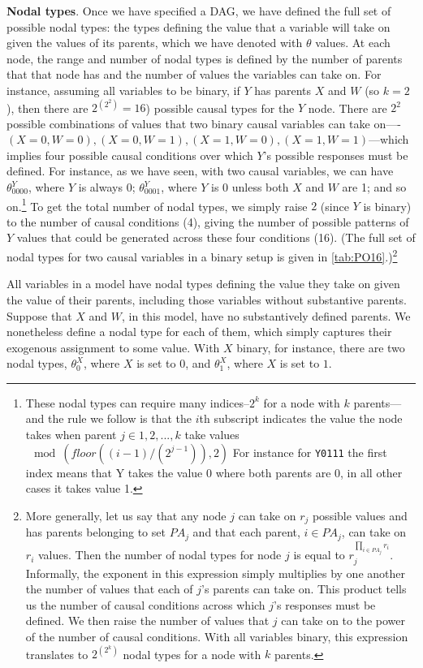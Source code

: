 \documentclass[12pt,]{book}
\let\rmarkdownfootnote\footnote%
\def\footnote{\protect\rmarkdownfootnote}
\begin{document}
\textbf{Nodal types}. Once we have specified a DAG, we have defined the full set of possible nodal types: the types defining the value that a variable will take on given the values of its parents, which we have denoted with \(\theta\) values. At each node, the range and number of nodal types is defined by the number of parents that that node has and the number of values the variables can take on. For instance, assuming all variables to be binary, if \(Y\) has parents \(X\) and \(W\) (so \(k=2\)), then there are \(2^{\left(2^2\right)}=16\)) possible causal types for the \(Y\) node. There are \(2^2\) possible combinations of values that two binary causal variables can take on----\((X=0,W=0), (X=0,W=1), (X=1,W=0), (X=1,W=1)\)---which implies four possible causal conditions over which \(Y\)'s possible responses must be defined. For instance, as we have seen, with two causal variables, we can have \(\theta^Y_{0000}\), where \(Y\) is always 0; \(\theta^Y_{0001}\), where \(Y\) is 0 unless both \(X\) and \(W\) are 1; and so on.\footnote{These nodal types can require many indices--\(2^k\) for a node with \(k\) parents---and the rule we follow is that the \(i\)th subscript indicates the value the node takes when parent \(j \in {1, 2, ..., k}\) take values \(\mod(floor((i-1)/(2^{j-1})), 2)\) For instance for \texttt{Y0111} the first index means that Y takes the value 0 where both parents are 0, in all other cases it takes value 1.} To get the total number of nodal types, we simply raise \(2\) (since \(Y\) is binary) to the number of causal conditions (4), giving the number of possible patterns of \(Y\) values that could be generated across these four conditions (16). (The full set of nodal types for two causal variables in a binary setup is given in \ref{tab:PO16}.)\footnote{More generally, let us say that any node \(j\) can take on \(r_j\) possible values and has parents belonging to set \(PA_j\) and that each parent, \(i \in PA_j\), can take on \(r_i\) values. Then the number of nodal types for node \(j\) is equal to \(r_j^{\prod_{i \in PA_j}r_i}\). Informally, the exponent in this expression simply multiplies by one another the number of values that each of \(j\)'s parents can take on. This product tells us the number of causal conditions across which \(j\)'s responses must be defined. We then raise the number of values that \(j\) can take on to the power of the number of causal conditions. With all variables binary, this expression translates to \(2^{\left(2^k\right)}\) nodal types for a node with \(k\) parents.}

All variables in a model have nodal types defining the value they take on given the value of their parents, including those variables without substantive parents. Suppose that \(X\) and \(W\), in this model, have no substantively defined parents. We nonetheless define a nodal type for each of them, which simply captures their exogenous assignment to some value. With \(X\) binary, for instance, there are two nodal types, \(\theta^X_{0}\), where \(X\) is set to \(0\), and \(\theta^X_{1}\), where \(X\) is set to \(1\).
\end{document}
